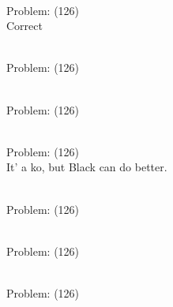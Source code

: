 \documentclass[11pt]{article}
\begin{document}
\begin{minipage}[t]{0.5\textwidth}
  {\centering
  
\\
Problem: (126)\\
Correct\\
  }
\end{minipage}
\begin{minipage}[t]{0.5\textwidth}
  {\centering
  
\\
Problem: (126)\\
  }
\end{minipage}
\begin{minipage}[t]{0.5\textwidth}
  {\centering
  
\\
Problem: (126)\\
  }
\end{minipage}
\begin{minipage}[t]{0.5\textwidth}
  {\centering
  
\\
Problem: (126)\\
It' a ko, but Black can do better.\\
  }
\end{minipage}
\begin{minipage}[t]{0.5\textwidth}
  {\centering
  
\\
Problem: (126)\\
  }
\end{minipage}
\begin{minipage}[t]{0.5\textwidth}
  {\centering
  
\\
Problem: (126)\\
  }
\end{minipage}
\begin{minipage}[t]{0.5\textwidth}
  {\centering
  
\\
Problem: (126)\\
  }
\end{minipage}
\end{document}

